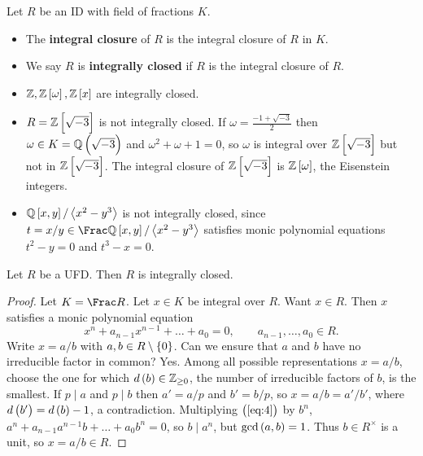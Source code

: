 \begin{definition}
Let $ R $ be an ID with field of fractions $ K $.
\begin{itemize}
\item The \textbf{integral closure} of $ R $ is the integral closure of $ R $ in $ K $.
\item We say $ R $ is \textbf{integrally closed} if $ R $ is the integral closure of $ R $.
\end{itemize}
\end{definition}

\begin{example*}
\hfill
\begin{itemize}
\item $ \ZZ, \ZZ\sbr{\omega}, \ZZ\sbr{x} $ are integrally closed.
\item $ R = \ZZ\sbr{\sqrt{-3}} $ is not integrally closed. If $ \omega = \tfrac{-1 + \sqrt{-3}}{2} $ then $ \omega \in K = \QQ\br{\sqrt{-3}} $ and $ \omega^2 + \omega + 1 = 0 $, so $ \omega $ is integral over $ \ZZ\sbr{\sqrt{-3}} $ but not in $ \ZZ\sbr{\sqrt{-3}} $. The integral closure of $ \ZZ\sbr{\sqrt{-3}} $ is $ \ZZ\sbr{\omega} $, the Eisenstein integers.
\item $ \QQ\sbr{x, y} / \abr{x^2 - y^3} $ is not integrally closed, since $ t = x / y \in \Frac \QQ\sbr{x, y} / \abr{x^2 - y^3} $ satisfies monic polynomial equations $ t^2 - y = 0 $ and $ t^3 - x = 0 $.
\end{itemize}
\end{example*}


\begin{proposition}
Let $ R $ be a UFD. Then $ R $ is integrally closed.
\end{proposition}

\begin{proof}
Let $ K = \Frac R $. Let $ x \in K $ be integral over $ R $. Want $ x \in R $. Then $ x $ satisfies a monic polynomial equation
\begin{equation}
\label{eq:4}
x^n + a_{n - 1}x^{n - 1} + \dots + a_0 = 0, \qquad a_{n - 1}, \dots, a_0 \in R.
\end{equation}
Write $ x = a / b $ with $ a, b \in R \setminus \cbr{0} $. Can we ensure that $ a $ and $ b $ have no irreducible factor in common? Yes. Among all possible representations $ x = a / b $, choose the one for which $ d\br{b} \in \ZZ_{\ge 0} $, the number of irreducible factors of $ b $, is the smallest. If $ p \mid a $ and $ p \mid b $ then $ a' = a / p $ and $ b' = b / p $, so $ x = a / b = a' / b' $, where $ d\br{b'} = d\br{b} - 1 $, a contradiction. Multiplying $ \br{\ref{eq:4}} $ by $ b^n $, $ a^n + a_{n - 1}a^{n - 1}b + \dots + a_0b^n = 0 $, so $ b \mid a^n $, but $ \gcd\br{a, b} = 1 $. Thus $ b \in R^\times $ is a unit, so $ x = a / b \in R $.
\end{proof}

